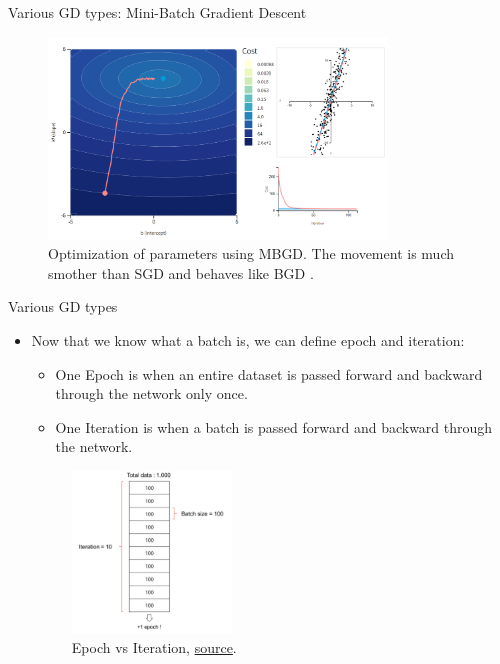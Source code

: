 \documentclass[compress,oilve,t]{beamer}
\newcommand{\tc}[2]{
	\textcolor{#1}{\hspace{-2pt}#2\hspace{-2pt}}
}
\begin{document}
\begin{frame}{Various GD types: Mini-Batch Gradient Descent}
	\begin{figure}[H]
		\centering
		\includegraphics[width=0.8\textwidth]{Figs/mbgd.png}
		\caption{Optimization of parameters using MBGD. The movement is much smother than SGD and behaves like BGD \cite{katanforoosh-kunin-opt}.}
	\end{figure} 
\end{frame}

\begin{frame}{Various GD types}
	\begin{itemize}
		\item Now that we know what a batch is, we can define epoch and iteration:
		\begin{itemize}
			\item One \tc{keywords}{Epoch} is when an entire dataset is passed forward and backward through the network only once.
			\item One \tc{keywords}{Iteration} is when a batch is passed forward and backward through the network. 
		\end{itemize}
		
		\begin{figure}[H]
			\centering
			\includegraphics[width=0.4\textwidth]{Figs/epoch-iteration.png}
			\caption{Epoch vs Iteration, \href{https://jerryan.medium.com/batch-size-a15958708a6}{source}.}
		\end{figure} 
	\end{itemize}
\end{frame}
\end{document}
